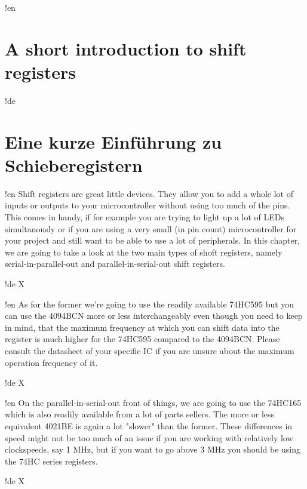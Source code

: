 !en \section{A short introduction to shift registers}
!de \section{Eine kurze Einführung zu Schieberegistern}

!en Shift registers are great little devices. They allow you to add a whole lot of inputs or outputs to your microcontroller without using too much of the pins. This comes in handy, if for example you are trying to light up a lot of LEDs simultanously or if you are using a very small (in pin count) microcontroller for your project and still want to be able to use a lot of peripherals. In this chapter, we are going to take a look at the two main types of shoft registers, namely serial-in-parallel-out and parallel-in-serial-out shift registers.

!de X

!en As for the former we're going to use the readily available 74HC595 but you can use the 4094BCN more or less interchangeably even though you need to keep in mind, that the maximum frequency at which you can shift data into the register is much higher for the 74HC595 compared to the 4094BCN. Please consult the datasheet of your specific IC if you are unsure about the maximum operation frequency of it.

!de X

!en On the parallel-in-serial-out front of things, we are going to use the 74HC165 which is also readily available from a lot of parts sellers. The more or less equivalent 4021BE is again a lot "slower" than the former. These differences in speed might not be too much of an issue if you are working with relatively low clockspeeds, say 1 MHz, but if you want to go above 3 MHz you should be using the 74HC series registers.

!de X



